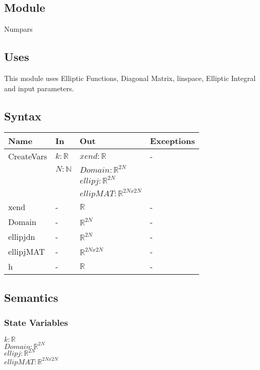 \documentclass[12pt, titlepage]{article}
\begin{document}
\subsection{Module}

Numpars

\subsection{Uses}

This module uses Elliptic Functions, Diagonal Matrix, linspace, Elliptic 
Integral and input parameters. 

\subsection{Syntax}

\begin{center}
	\begin{tabular}{p{3cm} p{3cm} p{7cm} >{\raggedright\arraybackslash}p{3cm}}
		\toprule
		\textbf{Name} & \textbf{In} & \textbf{Out} & \textbf{Exceptions} \\
		\hline
		CreateVars & $k :\mathbb{R}$ & 
		$xend: \mathbb{R}$ & - \\ 
		  &$N: \mathbb{N}$ & $Domain:\mathbb{R}^{2N}$ &  \\
		  &  & $ellipj: \mathbb{R}^{2N}$ &  \\ 
		  &  & $ellipMAT: \mathbb{R}^{2Nx2N}$ &  \\
		xend & - & $\mathbb{R}$ & - \\
		Domain & - & $\mathbb{R}^{2N}$ &- \\
		ellipjdn & - & $\mathbb{R}^{2N}$ &- \\
		ellipjMAT & - & $\mathbb{R}^{2Nx2N}$ &- \\
		h & - & $\mathbb{R}$ & -\\ 
		\hline
	\end{tabular}
\end{center}

\subsection{Semantics}

\subsubsection{State Variables}
$k :\mathbb{R}$ \\  
$Domain:\mathbb{R}^{2N}$ \\  
$ellipj: \mathbb{R}^{2N}$ \\ 
$ellipMAT: \mathbb{R}^{2Nx2N}$ \\  
\end{document}
